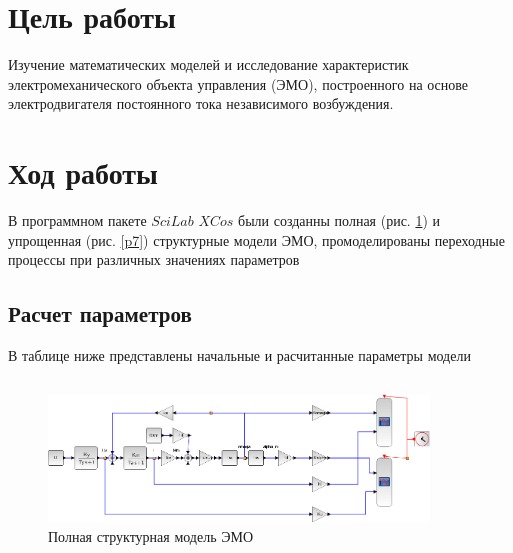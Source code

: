 \documentclass[a4paper,12pt,russian]{article} %
\begin{document}
		

	\renewcommand\titleBotRIGHT{
	\spboxmm{100}{70}{70}{30}{lc}{\parbox{70mm}{
			\normalsize{Преподаватель: Чепинский С.А. }\\ 
			\normalsize{Студенты: Французов Р.А.\\  Донцова М.А.}\\
			\normalsize{Группа: R3325}\\
			\normalsize{Вариант: 18}}}}

		\maketitle
		
		\section{Цель работы}
Изучение математических моделей и исследование характеристик
электромеханического объекта управления (ЭМО), построенного на основе электродвигателя
постоянного тока независимого возбуждения. \\
		
		\section{Ход работы}
В программном пакете $SciLab$ $XCos$ были созданны полная (рис. \ref{p1}) и упрощенная (рис. \ref{p7}) структурные модели ЭМО, промоделированы переходные процессы при различных значениях параметров \\


\subsection{Расчет параметров}
В таблице ниже представлены начальные и расчитанные параметры модели
\begin{center}
	\begin{tabular}{|c|c|c|}
		\hline
		
	\end{tabular}
\end{center}

\begin{figure}[H]
	\centering\includegraphics[width=0.9\textwidth]{1.png}
	\caption{Полная структурная модель ЭМО}\label{p1}
\end{figure}
\end{document}
